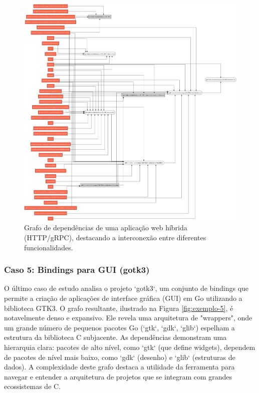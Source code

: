 \documentclass[12pt]{article}
\begin{document}
\begin{figure}[htbp]
\centering
\includegraphics[width=1\textwidth]{examples/gode.png}
\caption{Grafo de dependências de uma aplicação web híbrida (HTTP/gRPC), destacando a interconexão entre diferentes funcionalidades.}
\label{fig:exemplo-3}
\end{figure}

\subsubsection{Caso 5: Bindings para GUI (gotk3)}
O último caso de estudo analisa o projeto `gotk3`, um conjunto de bindings que permite a criação de aplicações de interface gráfica (GUI) em Go utilizando a biblioteca GTK3. O grafo resultante, ilustrado na Figura \ref{fig:exemplo-5}, é notavelmente denso e expansivo. Ele revela uma arquitetura de "wrappers", onde um grande número de pequenos pacotes Go (`gtk`, `gdk`, `glib`) espelham a estrutura da biblioteca C subjacente. As dependências demonstram uma hierarquia clara: pacotes de alto nível, como `gtk` (que define widgets), dependem de pacotes de nível mais baixo, como `gdk` (desenho) e `glib` (estruturas de dados). A complexidade deste grafo destaca a utilidade da ferramenta para navegar e entender a arquitetura de projetos que se integram com grandes ecossistemas de C.
\end{document}
